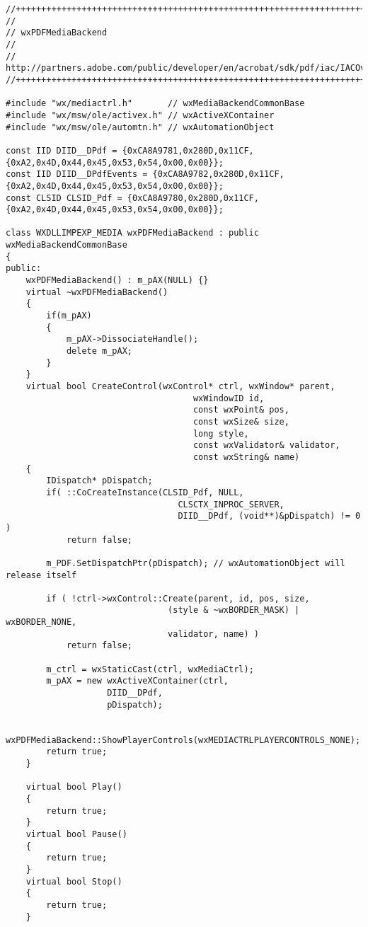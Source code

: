 \begin{verbatim}
//+++++++++++++++++++++++++++++++++++++++++++++++++++++++++++++++++++++++++++
//
// wxPDFMediaBackend
//
// http://partners.adobe.com/public/developer/en/acrobat/sdk/pdf/iac/IACOverview.pdf
//++++++++++++++++++++++++++++++++++++++++++++++++++++++++++++++++++++++++++++

#include "wx/mediactrl.h"       // wxMediaBackendCommonBase
#include "wx/msw/ole/activex.h" // wxActiveXContainer
#include "wx/msw/ole/automtn.h" // wxAutomationObject

const IID DIID__DPdf = {0xCA8A9781,0x280D,0x11CF,{0xA2,0x4D,0x44,0x45,0x53,0x54,0x00,0x00}};
const IID DIID__DPdfEvents = {0xCA8A9782,0x280D,0x11CF,{0xA2,0x4D,0x44,0x45,0x53,0x54,0x00,0x00}};
const CLSID CLSID_Pdf = {0xCA8A9780,0x280D,0x11CF,{0xA2,0x4D,0x44,0x45,0x53,0x54,0x00,0x00}};

class WXDLLIMPEXP_MEDIA wxPDFMediaBackend : public wxMediaBackendCommonBase
{
public:
    wxPDFMediaBackend() : m_pAX(NULL) {}
    virtual ~wxPDFMediaBackend()
    {
        if(m_pAX)
        {
            m_pAX->DissociateHandle();
            delete m_pAX;
        }
    }
    virtual bool CreateControl(wxControl* ctrl, wxWindow* parent,
                                     wxWindowID id,
                                     const wxPoint& pos,
                                     const wxSize& size,
                                     long style,
                                     const wxValidator& validator,
                                     const wxString& name)
    {
        IDispatch* pDispatch;
        if( ::CoCreateInstance(CLSID_Pdf, NULL,
                                  CLSCTX_INPROC_SERVER,
                                  DIID__DPdf, (void**)&pDispatch) != 0 )
            return false;

        m_PDF.SetDispatchPtr(pDispatch); // wxAutomationObject will release itself

        if ( !ctrl->wxControl::Create(parent, id, pos, size,
                                (style & ~wxBORDER_MASK) | wxBORDER_NONE,
                                validator, name) )
            return false;

        m_ctrl = wxStaticCast(ctrl, wxMediaCtrl);
        m_pAX = new wxActiveXContainer(ctrl,
                    DIID__DPdf,
                    pDispatch);

        wxPDFMediaBackend::ShowPlayerControls(wxMEDIACTRLPLAYERCONTROLS_NONE);
        return true;
    }

    virtual bool Play()
    {
        return true;
    }
    virtual bool Pause()
    {
        return true;
    }
    virtual bool Stop()
    {
        return true;
    }


\end{verbatim}
